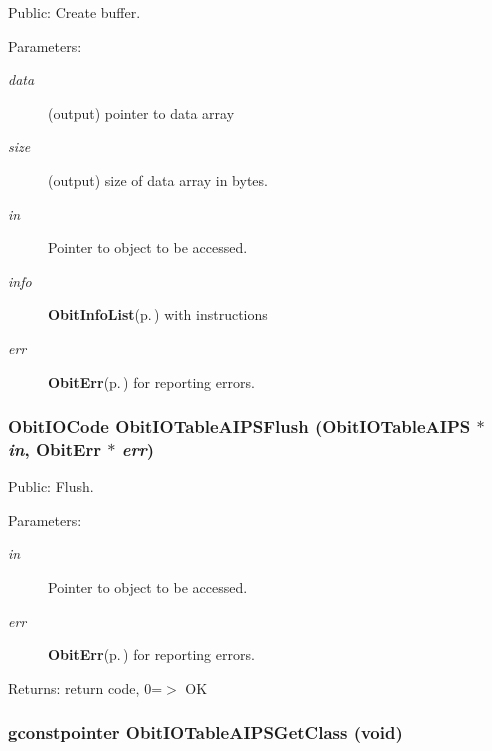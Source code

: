 Public: Create buffer. 

\begin{Desc}
\item[Parameters:]
\begin{description}
\item[{\em data}](output) pointer to data array \item[{\em size}](output) size of data array in bytes. \item[{\em in}]Pointer to object to be accessed. \item[{\em info}]{\bf Obit\-Info\-List}{\rm (p.\,\pageref{structObitInfoList})} with instructions \item[{\em err}]{\bf Obit\-Err}{\rm (p.\,\pageref{structObitErr})} for reporting errors. \end{description}
\end{Desc}
\subsubsection{\setlength{\rightskip}{0pt plus 5cm}Obit\-IOCode Obit\-IOTable\-AIPSFlush ({\bf Obit\-IOTable\-AIPS} $\ast$ {\em in}, {\bf Obit\-Err} $\ast$ {\em err})}\label{ObitIOTableAIPS_8h_a16}


Public: Flush. 

\begin{Desc}
\item[Parameters:]
\begin{description}
\item[{\em in}]Pointer to object to be accessed. \item[{\em err}]{\bf Obit\-Err}{\rm (p.\,\pageref{structObitErr})} for reporting errors. \end{description}
\end{Desc}
\begin{Desc}
\item[Returns:]return code, 0=$>$ OK \end{Desc}
\subsubsection{\setlength{\rightskip}{0pt plus 5cm}gconstpointer Obit\-IOTable\-AIPSGet\-Class (void)}\label{ObitIOTableAIPS_8h_a5}


